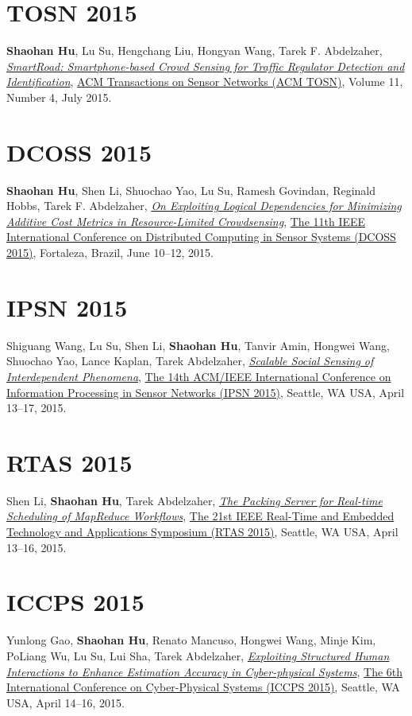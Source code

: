 \section{\sc TOSN 2015}\hypertarget{hu2015tosn}{}
\textbf{Shaohan Hu}, Lu Su, Hengchang Liu, Hongyan Wang, Tarek F. Abdelzaher,
\href{http://dl.acm.org/citation.cfm?id=2770876}{\emph{SmartRoad: Smartphone-based Crowd Sensing for Traffic Regulator Detection and Identification}},
\href{http://tosn.acm.org/}{\textsf{ACM Transactions on Sensor Networks (ACM TOSN)}},
Volume 11, Number 4, July 2015.

\section{\sc DCOSS 2015}\hypertarget{hu2015dcoss}{}
\textbf{Shaohan Hu}, Shen Li, Shuochao Yao, Lu Su, Ramesh Govindan, Reginald Hobbs, Tarek F. Abdelzaher,
\href{http://ieeexplore.ieee.org/document/7165037}{\emph{On Exploiting Logical Dependencies for Minimizing Additive Cost Metrics in Resource-Limited Crowdsensing}},
\href{http://www.dcoss.org/}{\textsf{The 11th IEEE International Conference on Distributed Computing in Sensor Systems (DCOSS 2015)}},
Fortaleza, Brazil, June 10--12, 2015.

\section{\sc IPSN 2015}\hypertarget{wang2015ipsn}{}
Shiguang Wang, Lu Su, Shen Li, \textbf{Shaohan Hu}, Tanvir Amin, Hongwei Wang, Shuochao Yao, Lance Kaplan, Tarek Abdelzaher,
\href{http://dl.acm.org/citation.cfm?id=2737114}{\emph{Scalable Social Sensing of Interdependent Phenomena}},
\href{http://ipsn.acm.org/2015/}{\textsf{The 14th ACM/IEEE International Conference on Information Processing in Sensor Networks (IPSN 2015)}},
Seattle, WA USA, April 13--17, 2015.

\section{\sc RTAS 2015}\hypertarget{li2015rtas}{}
Shen Li, \textbf{Shaohan Hu}, Tarek Abdelzaher,
\href{http://ieeexplore.ieee.org/document/7108416}{\emph{The Packing Server for Real-time Scheduling of MapReduce Workflows}},
\href{http://2015.rtas.org/}{\textsf{The 21st IEEE Real-Time and Embedded Technology and Applications Symposium (RTAS 2015)}},
Seattle, WA USA, April 13--16, 2015.

\section{\sc ICCPS 2015}\hypertarget{gao2015iccps}{}
Yunlong Gao, \textbf{Shaohan Hu}, Renato Mancuso, Hongwei Wang, Minje Kim, PoLiang Wu, Lu Su, Lui Sha, Tarek Abdelzaher,
\href{http://dl.acm.org/citation.cfm?id=2735960.2735965}{\emph{Exploiting Structured Human Interactions to Enhance Estimation Accuracy in Cyber-physical Systems}},
\href{http://iccps.acm.org/2015/}{\textsf{The 6th International Conference on Cyber-Physical Systems (ICCPS 2015)}},
Seattle, WA USA, April 14--16, 2015.

